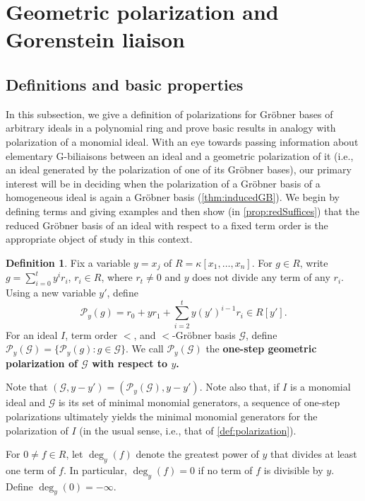 \documentclass[12pt, reqno]{amsart}
\numberwithin{equation}{section}
\newtheorem{Main Conjecture}[theorem]{Main Conjecture}
\theoremstyle{definition}
\newtheorem{defn}[theorem]{Definition}
\theoremstyle{plain}
\newcommand{\G}{\mathcal{G}}
\renewcommand{\P}{\mathcal{P}}
\begin{document}
 

\section{Geometric polarization and Gorenstein liaison}
\label{sect:geoPol}

\subsection{Definitions and basic properties}

In this subsection, we give a definition of polarizations for Gr\"obner bases of arbitrary ideals in a polynomial ring and prove basic results in analogy with polarization of a monomial ideal.  With an eye towards passing information about elementary G-biliaisons between an ideal and a geometric polarization of it (i.e., an ideal generated by the polarization of one of its Gr\"obner bases), our primary interest will be in deciding when the polarization of a Gr\"obner basis of a homogeneous ideal is again a Gr\"obner basis (\cref{thm:inducedGB}).  We begin by defining terms and giving examples and then show (in \cref{prop:redSuffices}) that the reduced Gr\"obner basis of an ideal with respect to a fixed term order is the appropriate object of study in this context.

\begin{defn}\label{def:geoPol}
Fix a variable $y = x_j$ of $R = \kappa[x_1, \ldots, x_n]$.  For $g \in R$, write $g=\sum_{i=0}^t y^ir_i$, $r_i \in R$, where $r_t \neq 0$ and $y$ does not divide any term of any $r_i$.  Using a new variable $y'$, define $$\P_y(g) = r_0+yr_1+\sum_{i=2}^t y(y')^{i-1}r_i \in R[y'].$$ For an ideal $I$, term order $<$, and $<$-Gr\"obner basis $\G$, define $\P_y(\G)=\{\P_y(g) \colon g \in \G\}$.  We call $\P_y(\G)$ the \bf{one-step geometric polarization of $\G$ with respect to $y$}. 
\end{defn}

Note that $(\G, y-y') = (\P_y(\G), y-y')$.  Note also that, if $I$ is a monomial ideal and $\G$ is its set of minimal monomial generators, a sequence of one-step polarizations ultimately yields the minimal monomial generators for the polarization of $I$ (in the usual sense, i.e., that of \cref{def:polarization}).  

For $0 \neq f \in R$, let $\deg_y(f)$ denote the greatest power of $y$ that divides at least one term of $f$. In particular, $\deg_y(f) = 0$ if no term of $f$ is divisible by $y$.  Define $\deg_y(0) = -\infty$.
\end{document}
